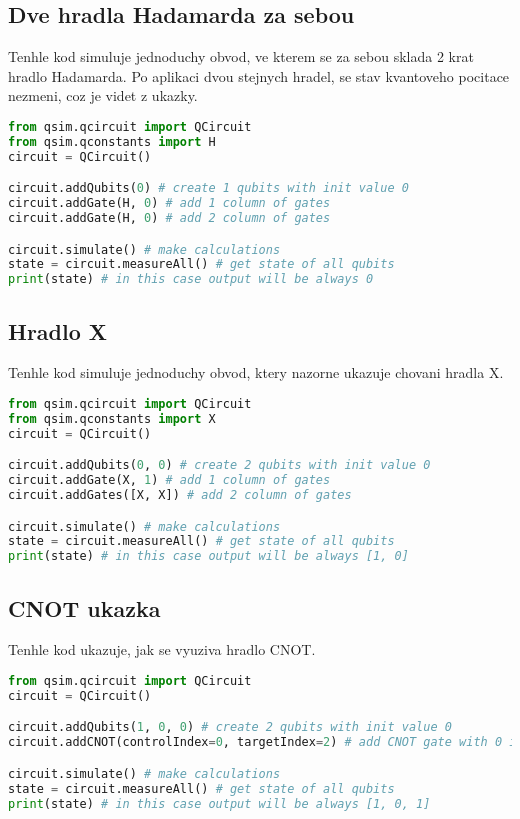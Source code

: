 \documentclass[12pt]{article}
\begin{document}
\subsection{Dve hradla Hadamarda za sebou}
Tenhle kod simuluje jednoduchy obvod, ve kterem se za sebou sklada 2 krat hradlo Hadamarda.
Po aplikaci dvou stejnych hradel, se stav kvantoveho pocitace nezmeni, coz je videt z ukazky.
\begin{lstlisting}[language=Python, caption=Double Hadamard gates]
from qsim.qcircuit import QCircuit
from qsim.qconstants import H
circuit = QCircuit()

circuit.addQubits(0) # create 1 qubits with init value 0
circuit.addGate(H, 0) # add 1 column of gates
circuit.addGate(H, 0) # add 2 column of gates

circuit.simulate() # make calculations
state = circuit.measureAll() # get state of all qubits
print(state) # in this case output will be always 0
\end{lstlisting}

\subsection{Hradlo X}
Tenhle kod simuluje jednoduchy obvod, ktery nazorne ukazuje chovani hradla X.
\begin{lstlisting}[language=Python, caption=X gates]
from qsim.qcircuit import QCircuit
from qsim.qconstants import X
circuit = QCircuit()

circuit.addQubits(0, 0) # create 2 qubits with init value 0
circuit.addGate(X, 1) # add 1 column of gates
circuit.addGates([X, X]) # add 2 column of gates

circuit.simulate() # make calculations
state = circuit.measureAll() # get state of all qubits
print(state) # in this case output will be always [1, 0]
\end{lstlisting}

\subsection{CNOT ukazka}
Tenhle kod ukazuje, jak se vyuziva hradlo CNOT.
\begin{lstlisting}[language=Python, caption=CNOT example]
from qsim.qcircuit import QCircuit
circuit = QCircuit()

circuit.addQubits(1, 0, 0) # create 2 qubits with init value 0
circuit.addCNOT(controlIndex=0, targetIndex=2) # add CNOT gate with 0 index qubit as control and 2 index as target

circuit.simulate() # make calculations
state = circuit.measureAll() # get state of all qubits
print(state) # in this case output will be always [1, 0, 1]
\end{lstlisting}
\end{document}
